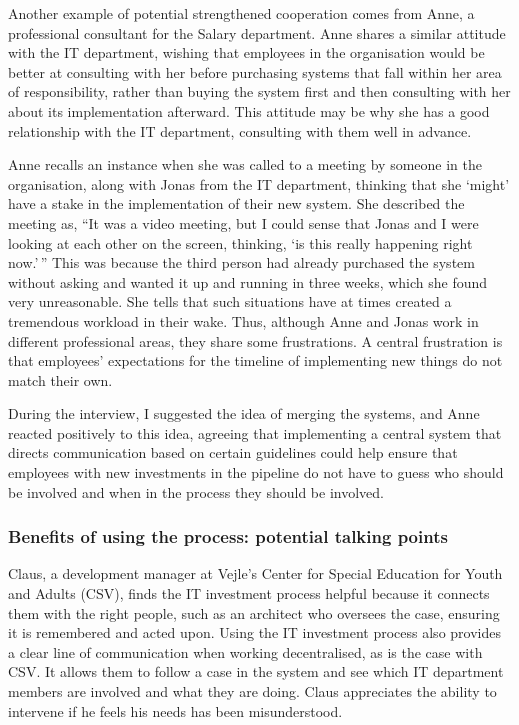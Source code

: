\documentclass[
]{book}
\begin{document}
Another example of potential strengthened cooperation comes from Anne, a professional consultant for the Salary department. Anne shares a similar attitude with the IT department, wishing that employees in the organisation would be better at consulting with her before purchasing systems that fall within her area of responsibility, rather than buying the system first and then consulting with her about its implementation afterward. This attitude may be why she has a good relationship with the IT department, consulting with them well in advance.

Anne recalls an instance when she was called to a meeting by someone in the organisation, along with Jonas from the IT department, thinking that she `might' have a stake in the implementation of their new system. She described the meeting as, ``It was a video meeting, but I could sense that Jonas and I were looking at each other on the screen, thinking, `is this really happening right now.'\,'' This was because the third person had already purchased the system without asking and wanted it up and running in three weeks, which she found very unreasonable. She tells that such situations have at times created a tremendous workload in their wake. Thus, although Anne and Jonas work in different professional areas, they share some frustrations. A central frustration is that employees' expectations for the timeline of implementing new things do not match their own.

During the interview, I suggested the idea of merging the systems, and Anne reacted positively to this idea, agreeing that implementing a central system that directs communication based on certain guidelines could help ensure that employees with new investments in the pipeline do not have to guess who should be involved and when in the process they should be involved.

\hypertarget{benefits-of-using-the-process-potential-talking-points}{%
\subsubsection{Benefits of using the process: potential talking points}\label{benefits-of-using-the-process-potential-talking-points}}

Claus, a development manager at Vejle's Center for Special Education for Youth and Adults (CSV), finds the IT investment process helpful because it connects them with the right people, such as an architect who oversees the case, ensuring it is remembered and acted upon. Using the IT investment process also provides a clear line of communication when working decentralised, as is the case with CSV. It allows them to follow a case in the system and see which IT department members are involved and what they are doing. Claus appreciates the ability to intervene if he feels his needs has been misunderstood.
\end{document}
